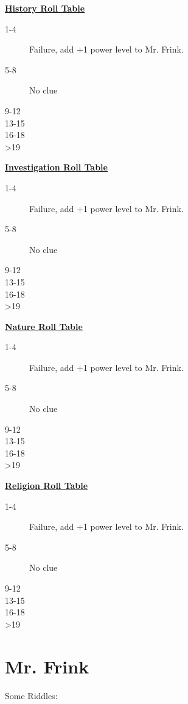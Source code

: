 \documentclass{article}
\begin{document}
\begin{multicols*}{2}
	\underline{\textbf{History Roll Table}}
	\begin{description}
		\item[1-4] Failure, add +1 power level to Mr. Frink.
		\item[5-8] No clue
		\item[9-12] 
		\item[13-15] 
		\item[16-18] 
		\item[>19] 
	\end{description}

	\underline{\textbf{Investigation Roll Table}}
	\begin{description}
		\item[1-4] Failure, add +1 power level to Mr. Frink.
		\item[5-8] No clue
		\item[9-12] 
		\item[13-15] 
		\item[16-18] 
		\item[>19] 
	\end{description}
	
	\underline{\textbf{Nature Roll Table}}
	\begin{description}
		\item[1-4] Failure, add +1 power level to Mr. Frink.
		\item[5-8] No clue
		\item[9-12] 
		\item[13-15] 
		\item[16-18] 
		\item[>19] 
	\end{description}

	\underline{\textbf{Religion Roll Table}}
	\begin{description}
		\item[1-4] Failure, add +1 power level to Mr. Frink.
		\item[5-8] No clue
		\item[9-12] 
		\item[13-15] 
		\item[16-18] 
		\item[>19] 
	\end{description}
	
	\section{Mr. Frink}

	Some Riddles:
	

\end{multicols*}
\end{document}
